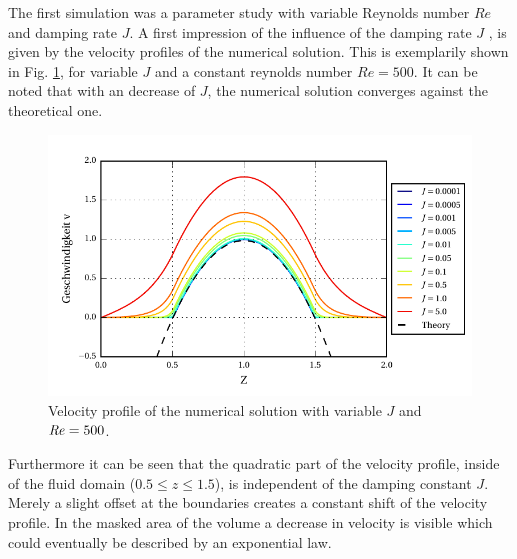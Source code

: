 The first simulation was  a parameter study with variable Reynolds number $Re$ and damping rate $J$.
A first impression of the influence of the damping rate $J$ , is given by the velocity profiles of the numerical solution.
This is exemplarily shown in Fig. \ref{fig:vp_flow}, for variable $J$ and a constant reynolds number $Re=500$.
It can be noted that with an decrease of $J$, the numerical solution converges against the theoretical one.

\begin{figure}[!b]
  \centering
  \includegraphics{gfx/immersed_boundary/poiseuille_flow/2_vp/vp_profile.pdf}  \caption{\label{fig:vp_flow}
    Velocity profile of the numerical solution with variable $J$ and $\mbox{\textit{Re}} = 500$.}
\end{figure}

Furthermore it can be seen that the quadratic part of the velocity profile,
inside of the fluid domain ($0.5\leq z \leq 1.5$), is independent of the damping constant $J$.
Merely a slight offset at the boundaries creates a constant shift of the velocity profile.
In the masked area of the volume a decrease in velocity is visible which could  eventually be described by an
exponential law.

